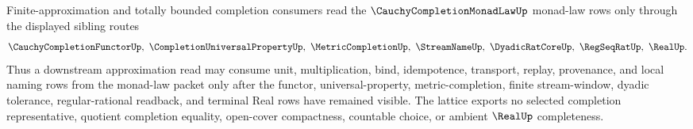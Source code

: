 \begin{theorem}
\label{thm:cauchy-completion-monad-law-forward-consumer-lattice}
Finite-approximation and totally bounded completion consumers read the $\CauchyCompletionMonadLawUp$ monad-law rows only through the displayed sibling routes
$$
\CauchyCompletionFunctorUp,\ \CompletionUniversalPropertyUp,\ \MetricCompletionUp,\ \StreamNameUp,\ \DyadicRatCoreUp,\ \RegSeqRatUp,\ \RealUp .
$$
Thus a downstream approximation read may consume unit, multiplication, bind, idempotence, transport, replay, provenance, and local naming rows from the monad-law packet only after the functor, universal-property, metric-completion, finite stream-window, dyadic tolerance, regular-rational readback, and terminal Real rows have remained visible. The lattice exports no selected completion representative, quotient completion equality, open-cover compactness, countable choice, or ambient $\RealUp$ completeness.
\end{theorem}
